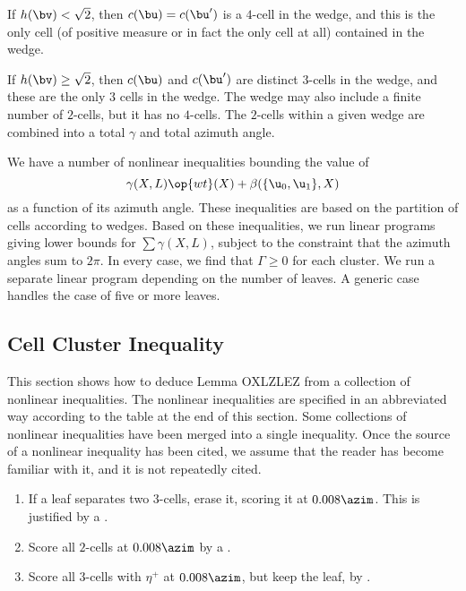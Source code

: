 If $h(\bv) < \sqrt2$, then $c(\bu)=c(\bu')$ is a $4$-cell in the wedge,
 and this is the only cell  (of positive measure or in fact the only cell at all)
contained in the wedge.

If $h(\bv)\ge\sqrt2$, then $c(\bu)$ and $c(\bu')$ are distinct $3$-cells in the wedge,
and these are the only $3$ cells in the wedge.  The wedge may also include a finite number of 
$2$-cells, but it has no $4$-cells.  The $2$-cells within a given wedge are combined into a 
total $\gamma$ and total azimuth angle.

We have a number of nonlinear inequalities bounding the value of 
\[
\gamma(X,L) \op{wt}(X) + \beta(\{\u_0,\u_1\},X)
\]
 as a function
of its azimuth angle.  These inequalities are based on the partition of cells according to wedges.
Based on these inequalities,
we run linear programs giving lower bounds for $\sum \gamma(X,L)$, subject to the constraint
that the azimuth angles sum to $2\pi$.  In every case, we find that $\Gamma\ge0$ for each cluster.
We run a separate linear program depending on the number of leaves.  A generic case handles
the case of five or more leaves.


\subsection{Cell Cluster Inequality}

This section shows how to deduce Lemma OXLZLEZ from a collection of nonlinear inequalities.
The nonlinear inequalities are specified in an abbreviated way according to the table at the end of this section.
Some collections of  nonlinear inequalities have been merged into a single inequality.
Once the source of a nonlinear inequality has been cited, we assume that the reader has become
familiar with it, and it is not repeatedly cited.

\begin{remark}[preparation]
\begin{enumerate}
\item If a leaf separates two $3$-cells, erase it, scoring it at $0.008\azim$.  This is justified by
a .
\item Score all $2$-cells at $0.008\azim$ by a .
\item Score all $3$-cells with $\eta ^+$ at $0.008\azim$, but keep the leaf, by .
\end{enumerate}
\end{remark}

